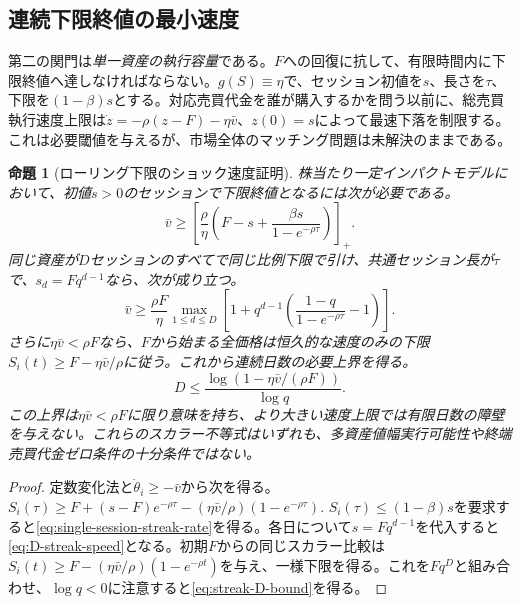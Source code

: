 \documentclass[11pt]{article}
\numberwithin{equation}{section}
\newtheorem{proposition}[theorem]{命題}
\theoremstyle{definition}
\theoremstyle{remark}
\begin{document}
\subsection{連続下限終値の最小速度}\label{subsec:multiday-rate}
第二の関門は\emph{単一資産の執行容量}である。$F$への回復に抗して、有限時間内に下限終値へ達しなければならない。$g(S)\equiv\eta$で、セッション初値を$s$、長さを$\tau$、下限を$(1-\beta)s$とする。対応売買代金を誰が購入するかを問う以前に、総売買執行速度上限は$\dot z=-\rho(z-F)-\eta\bar v$、$z(0)=s$によって最速下落を制限する。これは必要閾値を与えるが、市場全体のマッチング問題は未解決のままである。
\begin{proposition}[ローリング下限のショック速度証明]\label{prop:rolling-rate}
株当たり一定インパクトモデルにおいて、初値$s>0$のセッションで下限終値となるには次が必要である。
\begin{equation}\label{eq:single-session-streak-rate}
 \boxed{\quad\bar v\ge \left[\frac{\rho}{\eta}\left(F-s+
 \frac{\beta s}{1-e^{-\rho\tau}}\right)\right]_+.\quad}
\end{equation}
同じ資産が$D$セッションのすべてで同じ比例下限で引け、共通セッション長が$\tau$で、$s_d=Fq^{d-1}$なら、次が成り立つ。
\begin{equation}\label{eq:D-streak-speed}
\boxed{\quad\bar v\ge\frac{\rho F}{\eta}\max_{1\le d\le D}
 \left[1+q^{d-1}\left(\frac{1-q}{1-e^{-\rho\tau}}-1\right)\right].\quad}
\end{equation}
さらに$\eta\bar v<\rho F$なら、$F$から始まる全価格は恒久的な\emph{速度のみの}下限$S_i(t)\ge F-\eta\bar v/\rho$に従う。これから連続日数の必要上界を得る。
\begin{equation}\label{eq:streak-D-bound}
\boxed{\quad D\le\frac{\log(1-\eta\bar v/(\rho F))}{\log q}.\quad}
\end{equation}
この上界は$\eta\bar v<\rho F$に限り意味を持ち、より大きい速度上限では有限日数の障壁を与えない。これらのスカラー不等式はいずれも、多資産値幅実行可能性や終端売買代金ゼロ条件の十分条件ではない。
\end{proposition}
\begin{proof}
定数変化法と$\dot\theta_i\ge-\bar v$から次を得る。
$S_i(\tau)\ge F+(s-F)e^{-\rho\tau}-(\eta\bar v/\rho)(1-e^{-\rho\tau})$.
$S_i(\tau)\le(1-\beta)s$を要求すると\eqref{eq:single-session-streak-rate}を得る。各日について$s=Fq^{d-1}$を代入すると\eqref{eq:D-streak-speed}となる。初期$F$からの同じスカラー比較は$S_i(t)\ge F-(\eta\bar v/\rho)(1-e^{-\rho t})$を与え、一様下限を得る。これを$Fq^D$と組み合わせ、$\log q<0$に注意すると\eqref{eq:streak-D-bound}を得る。
\end{proof}
\end{document}
